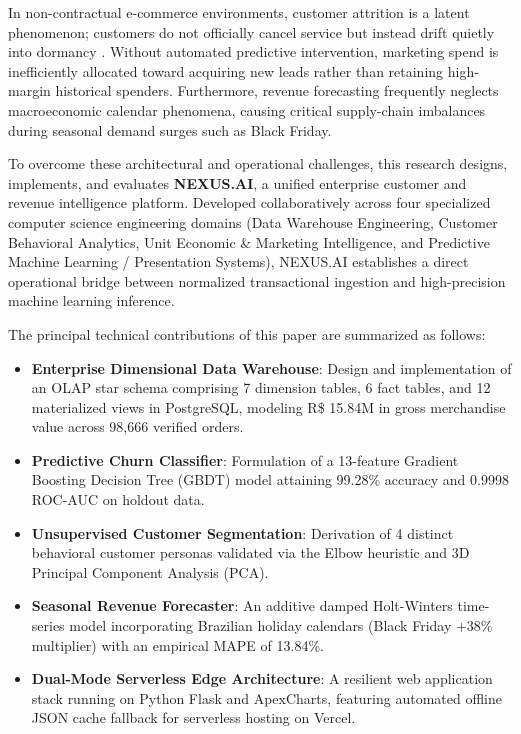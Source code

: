 \documentclass[conference]{IEEEtran}
\begin{document}
In non-contractual e-commerce environments, customer attrition is a latent phenomenon; customers do not officially cancel service but instead drift quietly into dormancy \cite{fader2005rfm}. Without automated predictive intervention, marketing spend is inefficiently allocated toward acquiring new leads rather than retaining high-margin historical spenders. Furthermore, revenue forecasting frequently neglects macroeconomic calendar phenomena, causing critical supply-chain imbalances during seasonal demand surges such as Black Friday.

To overcome these architectural and operational challenges, this research designs, implements, and evaluates \textbf{NEXUS.AI}, a unified enterprise customer and revenue intelligence platform. Developed collaboratively across four specialized computer science engineering domains (Data Warehouse Engineering, Customer Behavioral Analytics, Unit Economic \& Marketing Intelligence, and Predictive Machine Learning / Presentation Systems), NEXUS.AI establishes a direct operational bridge between normalized transactional ingestion and high-precision machine learning inference.

The principal technical contributions of this paper are summarized as follows:
\begin{itemize}
    \item \textbf{Enterprise Dimensional Data Warehouse}: Design and implementation of an OLAP star schema comprising 7 dimension tables, 6 fact tables, and 12 materialized views in PostgreSQL, modeling R\$ 15.84M in gross merchandise value across 98,666 verified orders.
    \item \textbf{Predictive Churn Classifier}: Formulation of a 13-feature Gradient Boosting Decision Tree (GBDT) model attaining 99.28\% accuracy and 0.9998 ROC-AUC on holdout data.
    \item \textbf{Unsupervised Customer Segmentation}: Derivation of 4 distinct behavioral customer personas validated via the Elbow heuristic and 3D Principal Component Analysis (PCA).
    \item \textbf{Seasonal Revenue Forecaster}: An additive damped Holt-Winters time-series model incorporating Brazilian holiday calendars (Black Friday +38\% multiplier) with an empirical MAPE of 13.84\%.
    \item \textbf{Dual-Mode Serverless Edge Architecture}: A resilient web application stack running on Python Flask and ApexCharts, featuring automated offline JSON cache fallback for serverless hosting on Vercel.
\end{itemize}
\end{document}
